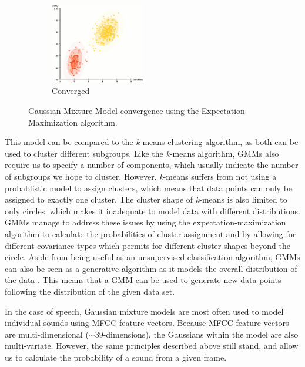 \documentclass
[
    a4paper,
    twoside,
    12pt,
]
{report}
\begin{document}
\begin{figure}[t!p]
   
   \begin{subfigure}[b]{\textwidth}
      \centering
      \includegraphics[width=0.45\textwidth]{img/em-alg4.jpg}
         \caption{Converged}
         \label{fig:gmm-conv}
   \end{subfigure}
   \quad
   \caption{Gaussian Mixture Model convergence using the Expectation-Maximization algorithm.}\label{fig:em-converge}
\end{figure}

This model can be compared to the \emph{k}-means clustering algorithm,
as both can be used to cluster different subgroups. Like the
\emph{k}-means algorithm, GMMs also require us to specify a number of
components, which usually indicate the number of subgroups we hope to
cluster. However, \emph{k}-means suffers from not using a probablistic
model to assign clusters, which means that data points can only be
assigned to exactly one cluster. The cluster shape of \emph{k}-means is
also limited to only circles, which makes it inadequate to model data
with different distributions. GMMs manage to address these issues by
using the expectation-maximization algorithm to calculate the
probabilities of cluster assignment and by allowing for different
covariance types which permits for different cluster shapes beyond the
circle. Aside from being useful as an unsupervised classification
algorithm, GMMs can also be seen as a generative algorithm as it models
the overall distribution of the data \parencite{mcgonagle2016}. This
means that a GMM can be used to generate new data points following the
distribution of the given data set.

In the case of speech, Gaussian mixture models are most often used to
model individual sounds using MFCC feature vectors. Because MFCC feature
vectors are multi-dimensional
(\begin{math} \sim \end{math}39-dimensions), the Gaussians within the
model are also multi-variate. However, the same principles described
above still stand, and allow us to calculate the probability of a sound
from a given frame.
\end{document}

